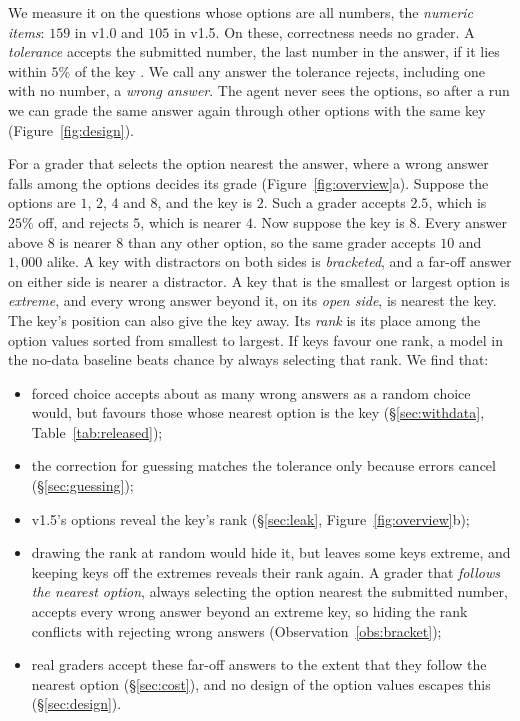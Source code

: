 \documentclass{article}
\begin{document}
We measure it on the questions whose options are all numbers, the \emph{numeric items}: $159$ in v1.0 and $105$ in
v1.5. On these, correctness needs no grader. A \emph{tolerance} accepts the submitted number, the last number in the
answer, if it lies within $5\%$ of the key \citep{scibench}. We call any answer the tolerance rejects, including one
with no number, a \emph{wrong answer}. The agent never sees the options, so after a run we can grade the same answer
again through other options with the same key (Figure~\ref{fig:design}).

For a grader that selects the option nearest the answer, where a wrong answer falls among the options decides its
grade (Figure~\ref{fig:overview}a). Suppose the options are $1$, $2$, $4$ and $8$, and the key is $2$. Such a grader
accepts $2.5$, which is $25\%$ off, and rejects $5$, which is nearer $4$. Now suppose the key is $8$. Every answer
above $8$ is nearer $8$ than any other option, so the same grader accepts $10$ and $1{,}000$ alike. A key with
distractors on both sides is \emph{bracketed}, and a far-off answer on either side is nearer a distractor. A key that
is the smallest or largest option is \emph{extreme}, and every wrong answer beyond it, on its \emph{open side}, is
nearest the key. The key's position can also give the key away. Its \emph{rank} is its place among the option values
sorted from smallest to largest. If keys favour one rank, a model in the no-data baseline beats chance by always
selecting that rank. We find that:
\begin{itemize}\setlength{\itemsep}{1pt}\setlength{\topsep}{2pt}\setlength{\parsep}{0pt}
\item forced choice accepts about as many wrong answers as a random choice would, but favours those whose nearest
option is the key (\S\ref{sec:withdata}, Table~\ref{tab:released});
\item the correction for guessing matches the tolerance only because errors cancel (\S\ref{sec:guessing});
\item v1.5's options reveal the key's rank (\S\ref{sec:leak}, Figure~\ref{fig:overview}b);
\item drawing the rank at random would hide it, but leaves some keys extreme, and keeping keys off the extremes
reveals their rank again. A grader that \emph{follows the nearest option}, always selecting the option nearest the
submitted number, accepts every wrong answer beyond an extreme key, so hiding the rank conflicts with rejecting wrong
answers (Observation~\ref{obs:bracket});
\item real graders accept these far-off answers to the extent that they follow the nearest option (\S\ref{sec:cost}),
and no design of the option values escapes this (\S\ref{sec:design}).
\end{itemize}
\end{document}
